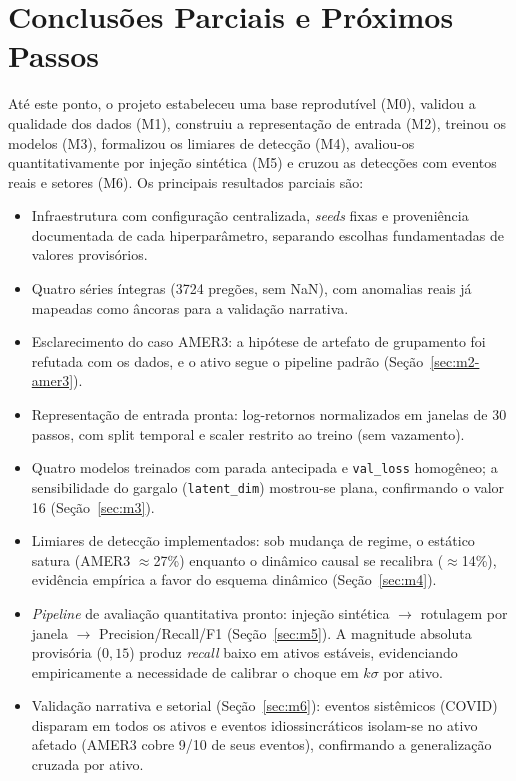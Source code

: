 \section{Conclusões Parciais e Próximos Passos}
\label{sec:conclusoes}

Até este ponto, o projeto estabeleceu uma base reprodutível (M0), validou a
qualidade dos dados (M1), construiu a representação de entrada (M2), treinou os modelos
(M3), formalizou os limiares de detecção (M4), avaliou-os quantitativamente por injeção
sintética (M5) e cruzou as detecções com eventos reais e setores (M6). Os principais
resultados parciais são:
\begin{itemize}[noitemsep]
  \item Infraestrutura com configuração centralizada, \emph{seeds} fixas e proveniência
        documentada de cada hiperparâmetro, separando escolhas fundamentadas de valores
        provisórios.
  \item Quatro séries íntegras (3724 pregões, sem NaN), com anomalias reais já mapeadas
        como âncoras para a validação narrativa.
  \item Esclarecimento do caso AMER3: a hipótese de artefato de grupamento foi refutada
        com os dados, e o ativo segue o pipeline padrão (Seção~\ref{sec:m2-amer3}).
  \item Representação de entrada pronta: log-retornos normalizados em janelas de 30 passos,
        com split temporal e scaler restrito ao treino (sem vazamento).
  \item Quatro modelos treinados com parada antecipada e \texttt{val\_loss} homogêneo; a
        sensibilidade do gargalo (\texttt{latent\_dim}) mostrou-se plana, confirmando o
        valor 16 (Seção~\ref{sec:m3}).
  \item Limiares de detecção implementados: sob mudança de regime, o estático satura
        (AMER3 $\approx$27\%) enquanto o dinâmico causal se recalibra ($\approx$14\%),
        evidência empírica a favor do esquema dinâmico (Seção~\ref{sec:m4}).
  \item \emph{Pipeline} de avaliação quantitativa pronto: injeção sintética $\to$ rotulagem
        por janela $\to$ Precision/Recall/F1 (Seção~\ref{sec:m5}). A magnitude absoluta
        provisória ($0{,}15$) produz \emph{recall} baixo em ativos estáveis, evidenciando
        empiricamente a necessidade de calibrar o choque em $k\sigma$ por ativo.
  \item Validação narrativa e setorial (Seção~\ref{sec:m6}): eventos sistêmicos (COVID)
        disparam em todos os ativos e eventos idiossincráticos isolam-se no ativo afetado
        (AMER3 cobre 9/10 de seus eventos), confirmando a generalização cruzada por ativo.
\end{itemize}

